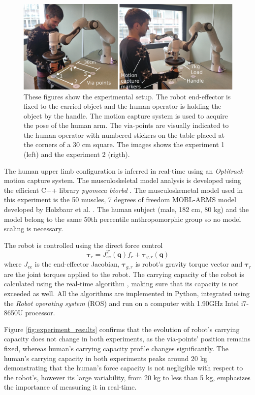 \begin{figure}[!t]
    \centering
    \includegraphics[width=\linewidth]{Papers/images/both_pose_explanation.jpg}
    \caption{{These figures show the experimental setup. The robot end-effector is fixed to the carried object and the human operator is holding the object by the handle. The motion capture system is used to acquire the pose of the human arm. The via-points are visually indicated to the human operator with numbered stickers on the table placed at the corners of a 30 cm square. The images shows the experiment 1 (left) and the experiment 2 (rigth).}}
    \label{fig:experiment}
\end{figure}

The human upper limb configuration is inferred in real-time using an \textit{Optitrack} motion capture system. The musculoskeletal model analysis is developed using the efficient C++ library \textit{pyomeca biorbd} \cite{Michaud2021}. The musculoskemetal model used in this experiment is the 50 muscles, 7 degrees of freedom MOBL-ARMS model \cite{saul2015benchmarking}  {developed by Holzbaur et al. \cite{holzbaur2005model}. The human subject (male, 182 cm, 80 kg) and the model belong to the same 50th percentile anthropomorphic group \cite{gordon1989anthropometric} so no model scaling \cite{correa20112782} is necessary.}

The robot is controlled using the direct force control
$$
\bm{\tau}_r = J_{ee}^T(\bm{q}) f_r + \bm{\tau}_{g,r}(\bm{q})
$$
where $J_{ee}$ is the end-effector Jacobian, $\bm{\tau}_{g,r}$ is robot's gravity torque vector and $\bm{\tau}_r$ are the joint torques applied to the robot. 
{The carrying capacity of the robot is calculated using the real-time algorithm} \cite{skuric:hal-02993408}, making sure that its capacity is not exceeded as well. All the algorithms are implemented in Python, integrated using the \textit{Robot operating system} (ROS) and run on a computer with 1.90GHz Intel i7-8650U processor. 

Figure \ref{fig:experiment_results} confirms that the evolution of robot's carrying capacity does not change in both experiments, as the via-points' position remains fixed, {whereas human's carrying capacity profile changes significantly}. The human's carrying capacity in both experiments peaks around 20 kg demonstrating that the human's force capacity is not negligible with respect to the robot's, however its large variability, from 20 kg to less than 5 kg, emphasizes the importance of measuring it in real-time.    

